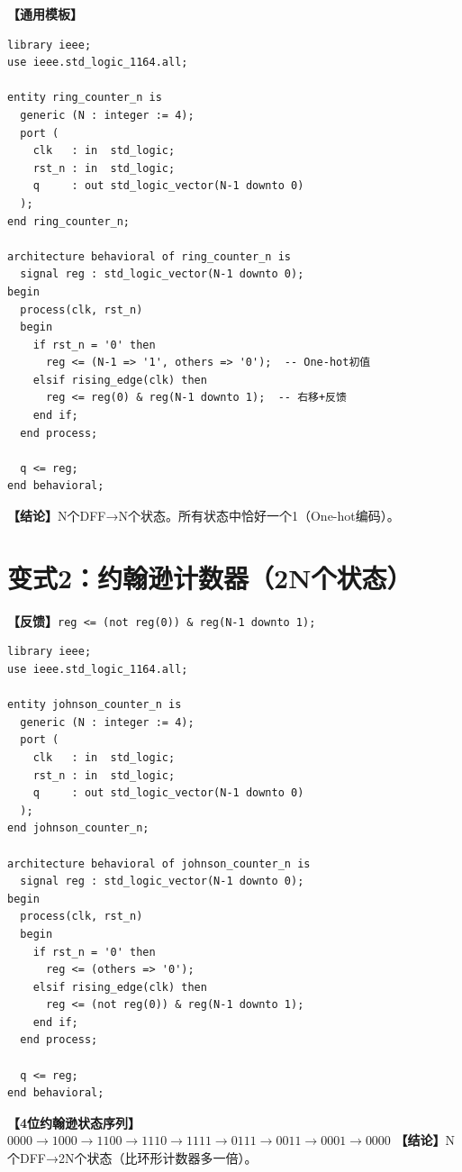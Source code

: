 \begin{detailbox}[完整教学]
\textbf{【通用模板】}
\begin{lstlisting}[caption={N位环形计数器（Generic实现）}]
library ieee;
use ieee.std_logic_1164.all;

entity ring_counter_n is
  generic (N : integer := 4);
  port (
    clk   : in  std_logic;
    rst_n : in  std_logic;
    q     : out std_logic_vector(N-1 downto 0)
  );
end ring_counter_n;

architecture behavioral of ring_counter_n is
  signal reg : std_logic_vector(N-1 downto 0);
begin
  process(clk, rst_n)
  begin
    if rst_n = '0' then
      reg <= (N-1 => '1', others => '0');  -- One-hot初值
    elsif rising_edge(clk) then
      reg <= reg(0) & reg(N-1 downto 1);  -- 右移+反馈
    end if;
  end process;

  q <= reg;
end behavioral;
\end{lstlisting}
\textbf{【结论】}N个DFF→N个状态。所有状态中恰好一个1（One-hot编码）。
\end{detailbox}


\section{变式2：约翰逊计数器（2N个状态）}

\begin{detailbox}[完整教学]
\textbf{【反馈】}\texttt{reg <= (not reg(0)) \& reg(N-1 downto 1);}

\begin{lstlisting}[caption={N位约翰逊计数器（Generic实现）}]
library ieee;
use ieee.std_logic_1164.all;

entity johnson_counter_n is
  generic (N : integer := 4);
  port (
    clk   : in  std_logic;
    rst_n : in  std_logic;
    q     : out std_logic_vector(N-1 downto 0)
  );
end johnson_counter_n;

architecture behavioral of johnson_counter_n is
  signal reg : std_logic_vector(N-1 downto 0);
begin
  process(clk, rst_n)
  begin
    if rst_n = '0' then
      reg <= (others => '0');
    elsif rising_edge(clk) then
      reg <= (not reg(0)) & reg(N-1 downto 1);
    end if;
  end process;

  q <= reg;
end behavioral;
\end{lstlisting}

\textbf{【4位约翰逊状态序列】}$0000\to1000\to1100\to1110\to1111\to0111\to0011\to0001\to0000$
\textbf{【结论】}N个DFF→2N个状态（比环形计数器多一倍）。
\end{detailbox}


